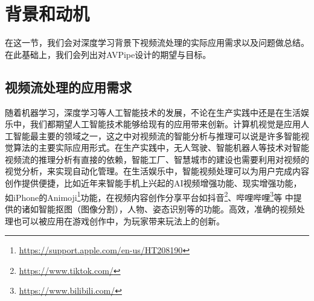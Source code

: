 
\chapter{背景和动机}
在这一节，我们会对深度学习背景下视频流处理的实际应用需求以及问题做总结。在此基础上，我们会列出对AVPipe设计的期望与目标。
\section{视频流处理的应用需求}\label{ch3:req}
随着机器学习，深度学习等人工智能技术的发展，不论在生产实践中还是在生活娱乐中，我们都期望人工智能技术能够给现有的应用带来创新。计算机视觉是应用人工智能最主要的领域之一，这之中对视频流的智能分析与推理可以说是许多智能视觉算法的主要实际应用形式。在生产实践中，无人驾驶、智能机器人等技术对智能视频流的推理分析有直接的依赖，智能工厂、智慧城市的建设也需要利用对视频的视觉分析，来实现自动化管理。在生活娱乐中，智能视频处理可以为用户完成内容创作提供便捷，比如近年来智能手机上兴起的AI视频增强功能、现实增强功能，如iPhone的Animoji\footnote{\url{https://support.apple.com/en-us/HT208190}}功能，在视频内容创作分享平台如抖音\footnote{\url{https://www.tiktok.com/}}、哔哩哔哩\footnote{\url{https://www.bilibili.com/}}等 %
中提供的诸如智能抠图（图像分割），人物、姿态识别等的功能。高效，准确的视频处理也可以被应用在游戏创作中，为玩家带来玩法上的创新。\par
